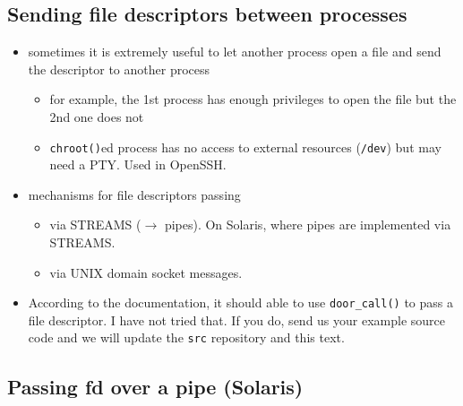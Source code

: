 

\subsection{Sending file descriptors between processes}

\begin{itemize}
\item sometimes it is extremely useful to let another process open a file and
send the descriptor to another process
	\begin{itemize}
	\item for example, the 1st process has enough privileges to open the
	file but the 2nd one does not
	\item \texttt{chroot()}ed process has no access to external resources
	(\texttt{/dev}) but may need a PTY. Used in OpenSSH.
	\end{itemize}
\item mechanisms for file descriptors passing
	\begin{itemize}
	\item via STREAMS ($\rightarrow$ pipes). On Solaris, where pipes are
	implemented via STREAMS.
	\item via UNIX domain socket messages.
	\end{itemize}
\end{itemize}

\begin{itemize}
\item According to the documentation, it should able to use
\texttt{door\_call()} to pass a file descriptor. I have not tried that. If you
do, send us your example source code and we will update the \texttt{src}
repository and this text.
\end{itemize}

\subsection{Passing fd over a pipe (Solaris)}


